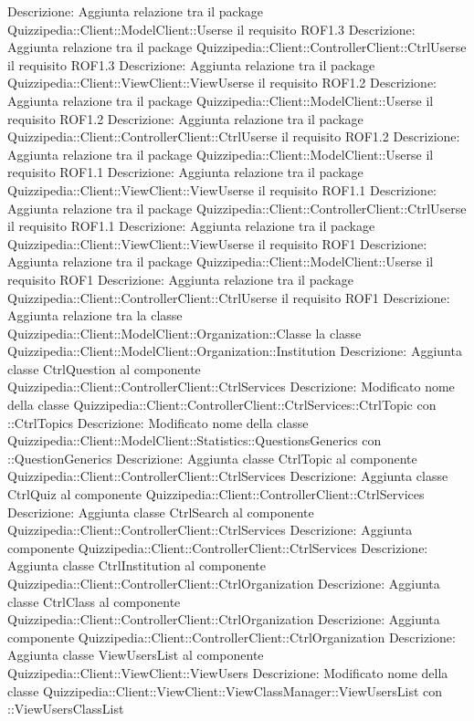 Descrizione: Aggiunta relazione tra il package Quizzipedia::Client::ModelClient::Userse il requisito ROF1.3 
Descrizione: Aggiunta relazione tra il package Quizzipedia::Client::ControllerClient::CtrlUserse il requisito ROF1.3 
Descrizione: Aggiunta relazione tra il package Quizzipedia::Client::ViewClient::ViewUserse il requisito ROF1.2 
Descrizione: Aggiunta relazione tra il package Quizzipedia::Client::ModelClient::Userse il requisito ROF1.2 
Descrizione: Aggiunta relazione tra il package Quizzipedia::Client::ControllerClient::CtrlUserse il requisito ROF1.2 
Descrizione: Aggiunta relazione tra il package Quizzipedia::Client::ModelClient::Userse il requisito ROF1.1 
Descrizione: Aggiunta relazione tra il package Quizzipedia::Client::ViewClient::ViewUserse il requisito ROF1.1 
Descrizione: Aggiunta relazione tra il package Quizzipedia::Client::ControllerClient::CtrlUserse il requisito ROF1.1 
Descrizione: Aggiunta relazione tra il package Quizzipedia::Client::ViewClient::ViewUserse il requisito ROF1 
Descrizione: Aggiunta relazione tra il package Quizzipedia::Client::ModelClient::Userse il requisito ROF1 
Descrizione: Aggiunta relazione tra il package Quizzipedia::Client::ControllerClient::CtrlUserse il requisito ROF1 
Descrizione: Aggiunta relazione tra la classe Quizzipedia::Client::ModelClient::Organization::Classe la classe Quizzipedia::Client::ModelClient::Organization::Institution 
Descrizione: Aggiunta classe CtrlQuestion al componente Quizzipedia::Client::ControllerClient::CtrlServices 
Descrizione: Modificato nome della classe Quizzipedia::Client::ControllerClient::CtrlServices::CtrlTopic con ::CtrlTopics 
Descrizione: Modificato nome della classe Quizzipedia::Client::ModelClient::Statistics::QuestionsGenerics con ::QuestionGenerics 
Descrizione: Aggiunta classe CtrlTopic al componente Quizzipedia::Client::ControllerClient::CtrlServices 
Descrizione: Aggiunta classe CtrlQuiz al componente Quizzipedia::Client::ControllerClient::CtrlServices 
Descrizione: Aggiunta classe CtrlSearch al componente Quizzipedia::Client::ControllerClient::CtrlServices 
Descrizione: Aggiunta componente Quizzipedia::Client::ControllerClient::CtrlServices 
Descrizione: Aggiunta classe CtrlInstitution al componente Quizzipedia::Client::ControllerClient::CtrlOrganization 
Descrizione: Aggiunta classe CtrlClass al componente Quizzipedia::Client::ControllerClient::CtrlOrganization 
Descrizione: Aggiunta componente Quizzipedia::Client::ControllerClient::CtrlOrganization 
Descrizione: Aggiunta classe ViewUsersList al componente Quizzipedia::Client::ViewClient::ViewUsers 
Descrizione: Modificato nome della classe Quizzipedia::Client::ViewClient::ViewClassManager::ViewUsersList con ::ViewUsersClassList 
